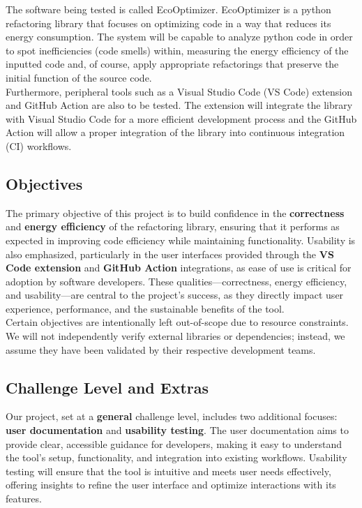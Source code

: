 \documentclass[12pt, titlepage]{article}
\begin{document}
The software being tested is called EcoOptimizer. EcoOptimizer is a
python refactoring library that focuses on optimizing code in a way
that reduces its energy consumption. The system will be capable to
analyze python code in order to spot inefficiencies (code smells)
within, measuring the energy efficiency of the inputted code and, of
course, apply appropriate refactorings that preserve the initial
function of the source code. \\

Furthermore, peripheral tools such as a Visual Studio Code (VS Code)
extension and GitHub Action are also to be tested. The extension will
integrate the library with Visual Studio Code for a more efficient
development process and the GitHub Action will allow a proper
integration of the library into continuous integration (CI) workflows.

\subsection{Objectives}

The primary objective of this project is to build confidence in the
\textbf{correctness} and \textbf{energy efficiency} of the
refactoring library, ensuring that it performs as expected in
improving code efficiency while maintaining functionality. Usability
is also emphasized, particularly in the user interfaces provided
through the \textbf{VS Code extension} and \textbf{GitHub Action}
integrations, as ease of use is critical for adoption by software
developers. These qualities—correctness, energy efficiency, and
usability—are central to the project’s success, as they directly
impact user experience, performance, and the sustainable benefits of the tool.\\

Certain objectives are intentionally left out-of-scope due to
resource constraints. We will not independently verify external
libraries or dependencies; instead, we assume they have been
validated by their respective development teams.

\subsection{Challenge Level and Extras}

Our project, set at a \textbf{general} challenge level, includes two
additional focuses: \textbf{user documentation} and \textbf{usability
testing}. The user documentation aims to provide clear, accessible
guidance for developers, making it easy to understand the tool’s
setup, functionality, and integration into existing workflows.
Usability testing will ensure that the tool is intuitive and meets
user needs effectively, offering insights to refine the user
interface and optimize interactions with its features.
\end{document}
